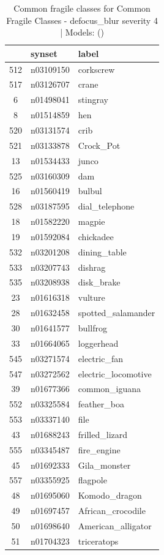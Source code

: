 \begin{table}
\caption{Common fragile classes for Common Fragile Classes - defocus_blur severity 4 | Models: ()}
\label{tab:Common Fragile Classes - defocus_blur severity 4_d41d8cd9}
\begin{tabular}{cll}
\toprule
 & synset & label \\
\midrule
512 & n03109150 & corkscrew \\
517 & n03126707 & crane \\
6 & n01498041 & stingray \\
8 & n01514859 & hen \\
520 & n03131574 & crib \\
521 & n03133878 & Crock_Pot \\
13 & n01534433 & junco \\
525 & n03160309 & dam \\
16 & n01560419 & bulbul \\
528 & n03187595 & dial_telephone \\
18 & n01582220 & magpie \\
19 & n01592084 & chickadee \\
532 & n03201208 & dining_table \\
533 & n03207743 & dishrag \\
535 & n03208938 & disk_brake \\
23 & n01616318 & vulture \\
28 & n01632458 & spotted_salamander \\
30 & n01641577 & bullfrog \\
33 & n01664065 & loggerhead \\
545 & n03271574 & electric_fan \\
547 & n03272562 & electric_locomotive \\
39 & n01677366 & common_iguana \\
552 & n03325584 & feather_boa \\
553 & n03337140 & file \\
43 & n01688243 & frilled_lizard \\
555 & n03345487 & fire_engine \\
45 & n01692333 & Gila_monster \\
557 & n03355925 & flagpole \\
48 & n01695060 & Komodo_dragon \\
49 & n01697457 & African_crocodile \\
50 & n01698640 & American_alligator \\
51 & n01704323 & triceratops \\

\end{tabular}
\end{table}
